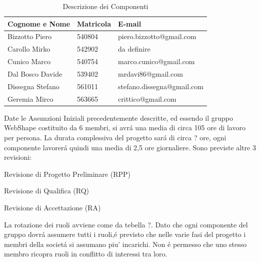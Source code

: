 \begin{table}[h]
	\begin{center}
		  \begin{tabular}{|p{}|l|l|}
		 \hline 
		 \textbf{Cognome e Nome} & \textbf{Matricola} & \textbf{E-mail}\\
		 \hline
		Bizzotto Piero & 540804 & piero.bizzotto@gmail.com \\
		Carollo Mirko & 542902 & da definire\\
		Cunico Marco & 540754 & marco.cunico@gmail.com\\
		Dal Bosco Davide & 539402 & mrdavi86@gmail.com\\
		Dissegna Stefano & 561011 & stefano.dissegna@gmail.com \\
		Geremia Mirco & 563665 & crittico@gmail.com\\
		\hline
		\end{tabular}
	\caption{Descrizione dei Componenti} 
	\label{tab:tabella_componenti}
	\end{center}	
\end{table}



Date le Assunzioni Iniziali precedentemente descritte, ed essendo il gruppo WebShape costituito da 6 membri, si avr\'a una media di circa 105 ore di lavoro per persona. La durata complessiva del progetto sar\'a di circa ? ore, ogni componente lavorer\'a quindi una media di 2,5 ore giornaliere. Sono previste altre 3 revisioni:
\begin{elenconumerato}{\normindent}
				\item Revisione di Progetto Preliminare (RPP)
				\item Revisione di Qualifica (RQ)
				\item Revisione di Accettazione (RA)
			\end{elenconumerato}
La rotazione dei ruoli avviene come da tebella ?. Dato che ogni componente del gruppo dovr\'a assumere tutti i ruoli,\'e previsto che nelle varie fasi del progetto i membri della societ\'a si assumano piu' incarichi. Non \'e permesso che uno stesso membro ricopra ruoli in conflitto di interessi tra loro.\\

